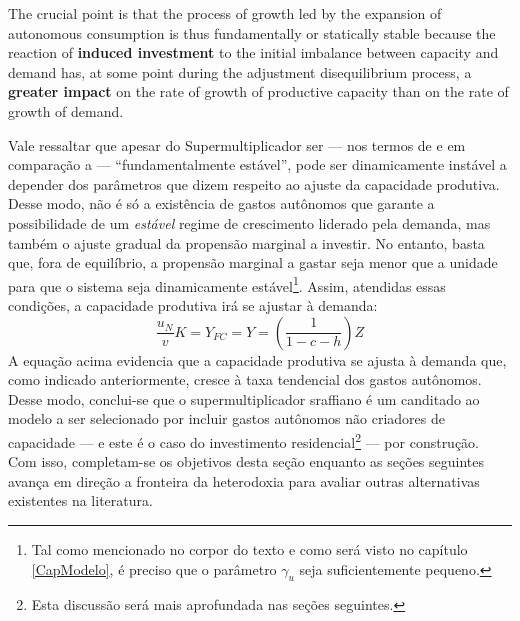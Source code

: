 \begin{citacao}
The crucial point is that the process of growth led by the expansion of autonomous consumption is thus fundamentally or statically stable because the reaction of \textbf{induced investment} to the initial imbalance between capacity and demand has, at some point during the adjustment disequilibrium process, a \textbf{greater impact} on the rate of growth of productive capacity than on the rate of growth of demand. \cite[p.~19, grifos adicionados]{serrano_trouble_2017}
\end{citacao}

Vale ressaltar que apesar do Supermultiplicador ser --- nos termos de \textcite{hicks_capital_1965} e em comparação a \textcite{harrod_essay_1939} --- ``fundamentalmente estável'', pode ser dinamicamente instável a depender dos parâmetros que dizem respeito ao ajuste da capacidade produtiva. Desse modo, não é só a existência de gastos autônomos que garante a possibilidade de um \textit{estável} regime de crescimento liderado pela demanda, mas também o ajuste gradual da propensão marginal a investir. No entanto, basta que, fora de equilíbrio, a propensão marginal a gastar seja menor que a unidade para que o sistema seja dinamicamente estável\footnote{Tal como mencionado no corpor do texto e como será visto no capítulo \ref{CapModelo}, é preciso que o parâmetro $\gamma_u$ seja suficientemente pequeno.}. Assim, atendidas essas condições, a capacidade produtiva irá se ajustar à demanda:
$$
 \frac{u_N}{v}K = Y_{FC} = Y = \left(\frac{1}{1 - c - h}\right)Z
$$
A equação acima evidencia que a capacidade produtiva se ajusta à demanda que, como indicado anteriormente, cresce à taxa tendencial dos gastos autônomos. 
Desse modo, conclui-se que o supermultiplicador sraffiano é um canditado ao modelo a ser selecionado por incluir gastos autônomos não criadores de capacidade --- e este é o caso do investimento residencial\footnote{Esta discussão será mais aprofundada nas seções seguintes.} --- por construção.
Com isso, completam-se os objetivos desta seção enquanto as seções seguintes avança em direção a fronteira da heterodoxia para avaliar outras alternativas existentes na literatura.


